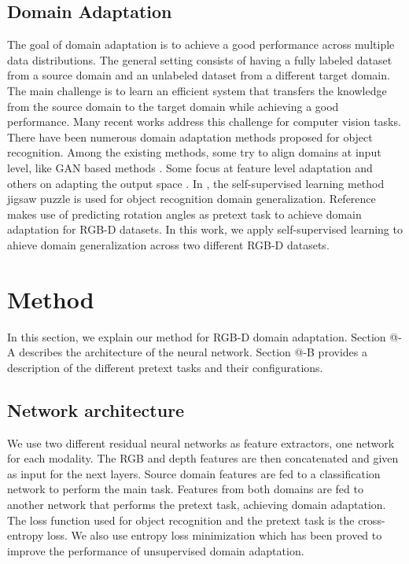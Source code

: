 \documentclass[conference]{IEEEtran}
\makeatletter
\newcommand*{\rom}[1]{\expandafter\@slowromancap\romannumeral #1@}
\makeatother
\begin{document}
\subsection{Domain Adaptation}
The goal of domain adaptation is to achieve a good performance across multiple data distributions. The general setting consists of having a fully labeled  dataset from a source domain and  an unlabeled dataset from a different target domain. The main challenge is to learn an efficient system that transfers the knowledge from the source domain to the target domain while achieving a good performance. Many recent works address this challenge for computer vision tasks. 
\\
There have been numerous domain adaptation methods proposed for object recognition. Among the existing methods, some try to align domains at input level, like GAN based methods \cite{b3}. Some focus at feature level adaptation \cite{b4} and others on adapting the output space \cite{b5}. In \cite{b6}, the self-supervised learning method jigsaw puzzle is used for object recognition domain generalization. 
Reference \cite{b7} makes use of predicting rotation angles as pretext task to achieve domain adaptation for RGB-D datasets. 
\newline
In this work, we apply self-supervised learning to ahieve domain generalization across two different RGB-D datasets.

\section{Method}
In this section, we explain our method for RGB-D domain adaptation. Section \rom{3}-A describes the architecture of the neural network. Section \rom{3}-B provides a description of the different pretext tasks and their configurations. 

\subsection{Network architecture}
We use two different residual neural networks as feature extractors, one network for each modality. The RGB and depth features are then concatenated and given as input for the next layers. Source domain features are fed to a classification network to perform the main task. Features from both domains are fed to another network that performs the pretext task,  achieving domain adaptation. The loss function used for object recognition and the pretext task is the cross-entropy loss.
We also use entropy loss minimization which has been proved to improve the performance of unsupervised domain adaptation.
\end{document}
